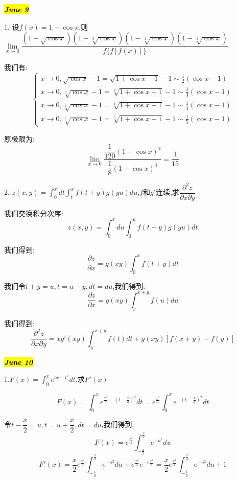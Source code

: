 
\hl{\textbf{\textit{June 9}}}

1. 设$f(x)=1-\cos x$,则$\lim\limits_{x\rightarrow 0}\dfrac{(1-\sqrt{\cos x})(1-\sqrt[3]{\cos x})(1-\sqrt[4]{\cos x})(1-\sqrt[5]{\cos x})}{f\{f[f(x)]\}}$
\begin{solution}
	
	我们有: 
	$$\left\lbrace 
	\begin{array}{l}
		x\rightarrow 0,\sqrt{\cos x}-1=\sqrt{1+\cos x-1}-1\sim \frac{1}{2}(\cos x-1) \\
		x\rightarrow 0,\sqrt[3]{\cos x}-1=\sqrt[3]{1+\cos x-1}-1\sim \frac{1}{3}(\cos x-1)\\
		x\rightarrow 0,\sqrt[4]{\cos x}-1=\sqrt[4]{1+\cos x-1}-1\sim \frac{1}{4}(\cos x-1)\\
		x\rightarrow 0,\sqrt[5]{\cos x}-1=\sqrt[5]{1+\cos x-1}-1\sim \frac{1}{5}(\cos x-1)
	\end{array}
	\right. $$
	
	原极限为: 
	$$\lim\limits_{x\rightarrow 0}\dfrac{\dfrac{1}{120}(1-\cos x)^4}{\dfrac{1}{8}(1-\cos x)^4}=\frac{1}{15}$$
\end{solution}

2. $z(x,y)=\int_{0}^{x}dt\int_{t}^{x}f(t+y)g(yu)du$,$f\text{和}g'$连续,求$\dfrac{\partial^2 z}{\partial x\partial y}$
\begin{solution}
	
	我们交换积分次序: 
	$$z(x,y)=\int_{0}^{x}du\int_{0}^{u}f(t+y)g(yu)dt$$
	
	我们得到: 
	$$\dfrac{\partial z}{\partial x}=g(xy)\int_{0}^{x}f(t+y)dt$$
	
	我们令$t+y=u,t=u-y,dt=du$,我们得到: 
	$$\dfrac{\partial z}{\partial x}=g(xy)\int_{y}^{x+y}f(u)du$$
	
	我们得到: 
	$$\dfrac{\partial^2 z}{\partial x\partial y}=xg'(xy)\int_{y}^{x+y}f(t)dt+g(xy)[f(x+y)-f(y)]$$
\end{solution}


\hl{\textbf{\textit{June 10}}}

1.$F(x)=\int_{0}^{x}e^{tx-t^2}dt$,求$F'(x)$
\begin{solution}
	$$F(x)=\int_{0}^{x}e^{\frac{x^2}{4}-(t-\frac{x}{2})^2}dt=e^{\frac{x^2}{4}}\int_{0}^{x}e^{-(t-\frac{x}{2})^2}dt$$
	
	令$t-\dfrac{x}{2}=u,t=u+\dfrac{x}{2},dt=du$,我们得到: 
	$$F(x)=e^{\frac{x^2}{4}}\int_{-\frac{x}{2}}^{\frac{x}{2}}e^{-u^2}du$$
	$$F'(x)=\frac{x}{2}e^{\frac{x^2}{4}}\int_{-\frac{x}{2}}^{\frac{x}{2}}e^{-u^2}du+e^{\frac{x^2}{4}}e^{-1\frac{x^2}{4}}=\frac{x}{2}e^{\frac{x^2}{4}}\int_{-\frac{x}{2}}^{\frac{x}{2}}e^{-u^2}du+1$$
\end{solution}

